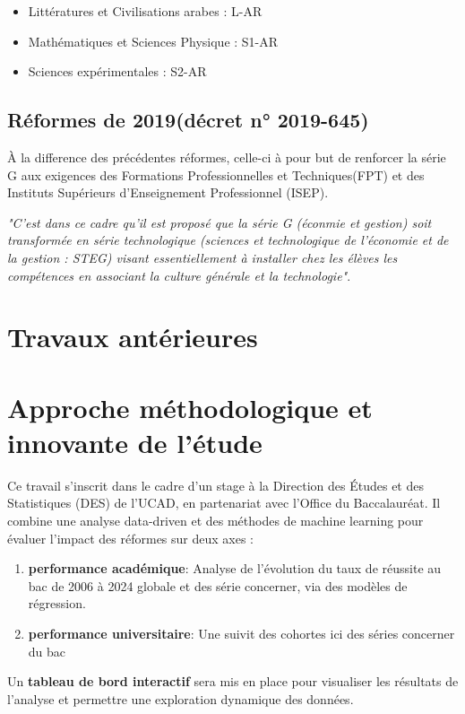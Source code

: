 \begin{itemize}
    \item Littératures et Civilisations arabes : L-AR 
    \item Mathématiques et Sciences Physique : S1-AR
    \item Sciences expérimentales : S2-AR
\end{itemize} 

\subsection{Réformes de 2019(décret n° 2019-645)}

À la difference des précédentes réformes, celle-ci à pour but de renforcer la série G aux exigences des Formations Professionnelles et Techniques(FPT)
et des Instituts Supérieurs d'Enseignement Professionnel (ISEP).

\textit{"C'est dans ce cadre qu'il est proposé que la série G (éconmie et gestion) soit transformée en série technologique (sciences et technologique de l'économie et de la gestion : STEG)
visant essentiellement à installer chez les élèves les compétences en associant la culture générale et la technologie"}\cite{decret2019}.

\section{Travaux antérieures }

\section{Approche méthodologique et innovante de l'étude}

Ce travail s’inscrit dans le cadre d’un stage à la Direction des Études et des Statistiques (DES) de l’UCAD, en partenariat avec l’Office du Baccalauréat. 
Il combine une analyse data-driven et des méthodes de machine learning pour évaluer l’impact des réformes sur deux axes :
\begin{enumerate}
    \item \textbf{performance académique}: Analyse de l'évolution du taux de réussite au bac de 2006 à 2024 globale et des série concerner, via des modèles de régression.
    \item \textbf{performance universitaire}: Une suivit des cohortes ici des séries concerner du bac 
\end{enumerate}
Un \textbf{tableau de bord interactif} sera mis en place pour visualiser les résultats de l'analyse et permettre une exploration dynamique des données.


